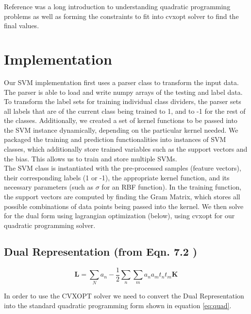 \documentclass[journal]{IEEEtran}
\begin{document}
Reference \cite{QuadraticCVXOPT} was a long introduction to understanding quadratic programming problems as well as forming the constraints to fit into cvxopt solver to find the final values.\\




\section{Implementation}
    Our SVM implementation first uses a parser class to transform the input data.  The parser is able to load and write numpy arrays of the testing and label data.  To transform the label sets for training individual class dividers, the parser sets all labels that are of the current class being trained to 1, and to -1 for the rest of the classes.  Additionally, we created a set of kernel functions to be passed into the SVM instance dynamically, depending on the particular kernel needed.  We packaged the training and prediction functionalities into instances of SVM classes, which additionally store trained variables such as the support vectors and the bias.  This allows us to train and store multiple SVMs.\\

    The SVM class is instantiated with the pre-processed samples (feature vectors), their corresponding labels (1 or -1), the appropriate kernel function, and its necessary parameters (such as $\sigma$ for an RBF function).  In the training function, the support vectors are computed by finding the Gram Matrix, which stores all possible combinations of data points being passed into the kernel. We then solve for the dual form using lagrangian optimization (below), using cvxopt for our quadratic programming solver.

    \subsection{Dual Representation (from Eqn. 7.2 \cite{BishopBook})}
    \begin{equation}
    \mathbf{L} = \sum\limits_{N} a_n - \frac{1}{2} \sum\limits_{n} \sum\limits_{m} a_n a_m t_n t_m \mathbf{K}
    \end{equation}

    In order to use the CVXOPT solver we need to convert the Dual Representation into the standard quadratic programming form shown in equation \ref{eq:quad}.
\end{document}
